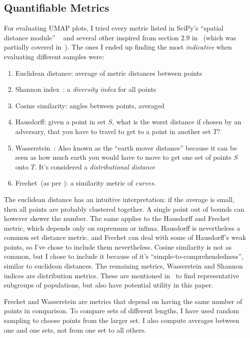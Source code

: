 \documentclass[10pt,twocolumn,letterpaper]{article}
\begin{document}
\subsection{Quantifiable Metrics}\label{sec:quantifiable}
For evaluating \gls{UMAP} plots, I tried every metric listed in SciPy's ``spatial distance module'' ~\cite{scipy} and several other inspired from section $2.9$ in~\cite{datarepresentativity} (which was partially covered in~). The ones I ended up finding the most \textit{indicative} when evaluating different samples were:
\begin{enumerate}
  \item Euclidean distance: average of metric distances between points
  \item Shannon index~\cite{shannon1948mathematical}: a \textit{diversity index} for all points 
  \item Cosine similarity: angles between points, averaged
  \item Hausdorff: given a point in set $S$, what is the worst distance if chosen by an adversary, that you have to travel to get to a point in another set $T$?
  \item Wasserstein~\cite{vaserstein1969markov}: Also known as the ``earth mover distance'' because it can be seen as how much earth you would have to move to get one set of points $S$ onto $T$. It's considered a \textit{distributional distance}
  \item Frechet~(as per \cite{eiter1994computing}): a similarity metric of \textit{curves}.
\end{enumerate}

The euclidean distance has an intuitive interpretation: if the average is small, then all points are probably clustered together. A single point out of bounds can however skewer the number. The same applies to the Hausdorff and Frechet metric, which depends only on supremum or infima. Hausdorff is nevertheless a common set distance metric, and Frechet can deal with some of Hausdorff's weak points, so I've chose to include them nevertheless. Cosine similarity is not as common, but I chose to include it because of it's ``simple-to-comprehendedness'', similar to euclidean distances. The remaining metrics, Wasserstein and Shannon indices are distribution metrics. These are mentioned in~\cite{datarepresentativity} to find representative subgroups of populations, but also have potential utility in this paper. 

Frechet and Wasserstein are metrics that depend on having the same number of points in comparison. To compare sets of different lengths, I have used random sampling to choose points from the larger set. I also compute averages between one and one sets, not from one set to all others.
\end{document}
